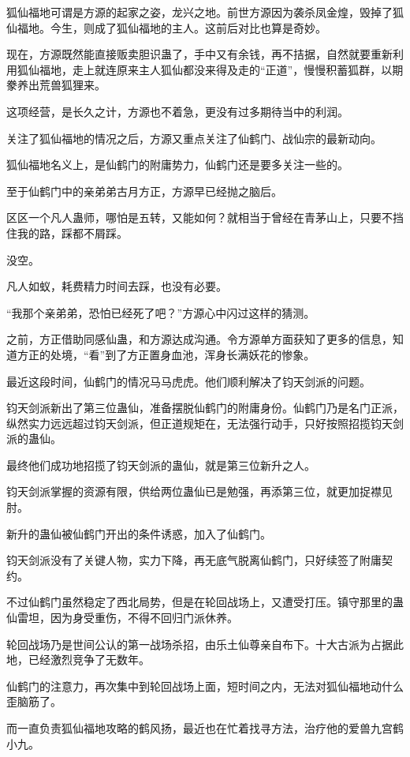 \begin{this_body}
狐仙福地可谓是方源的起家之姿，龙兴之地。前世方源因为袭杀凤金煌，毁掉了狐仙福地。今生，则成了狐仙福地的主人。这前后对比也算是奇妙。

现在，方源既然能直接贩卖胆识蛊了，手中又有余钱，再不拮据，自然就要重新利用狐仙福地，走上就连原来主人狐仙都没来得及走的“正道”，慢慢积蓄狐群，以期豢养出荒兽狐狸来。

这项经营，是长久之计，方源也不着急，更没有过多期待当中的利润。

关注了狐仙福地的情况之后，方源又重点关注了仙鹤门、战仙宗的最新动向。

狐仙福地名义上，是仙鹤门的附庸势力，仙鹤门还是要多关注一些的。

至于仙鹤门中的亲弟弟古月方正，方源早已经抛之脑后。

区区一个凡人蛊师，哪怕是五转，又能如何？就相当于曾经在青茅山上，只要不挡住我的路，踩都不屑踩。

没空。

凡人如蚁，耗费精力时间去踩，也没有必要。

“我那个亲弟弟，恐怕已经死了吧？”方源心中闪过这样的猜测。

之前，方正借助同感仙蛊，和方源达成沟通。令方源单方面获知了更多的信息，知道方正的处境，“看”到了方正置身血池，浑身长满妖花的惨象。

最近这段时间，仙鹤门的情况马马虎虎。他们顺利解决了钧天剑派的问题。

钧天剑派新出了第三位蛊仙，准备摆脱仙鹤门的附庸身份。仙鹤门乃是名门正派，纵然实力远远超过钧天剑派，但正道规矩在，无法强行动手，只好按照招揽钧天剑派的蛊仙。

最终他们成功地招揽了钧天剑派的蛊仙，就是第三位新升之人。

钧天剑派掌握的资源有限，供给两位蛊仙已是勉强，再添第三位，就更加捉襟见肘。

新升的蛊仙被仙鹤门开出的条件诱惑，加入了仙鹤门。

钧天剑派没有了关键人物，实力下降，再无底气脱离仙鹤门，只好续签了附庸契约。

不过仙鹤门虽然稳定了西北局势，但是在轮回战场上，又遭受打压。镇守那里的蛊仙雷坦，因为身受重伤，不得不回归门派休养。

轮回战场乃是世间公认的第一战场杀招，由乐土仙尊亲自布下。十大古派为占据此地，已经激烈竞争了无数年。

仙鹤门的注意力，再次集中到轮回战场上面，短时间之内，无法对狐仙福地动什么歪脑筋了。

而一直负责狐仙福地攻略的鹤风扬，最近也在忙着找寻方法，治疗他的爱兽九宫鹤小九。


\end{this_body}

